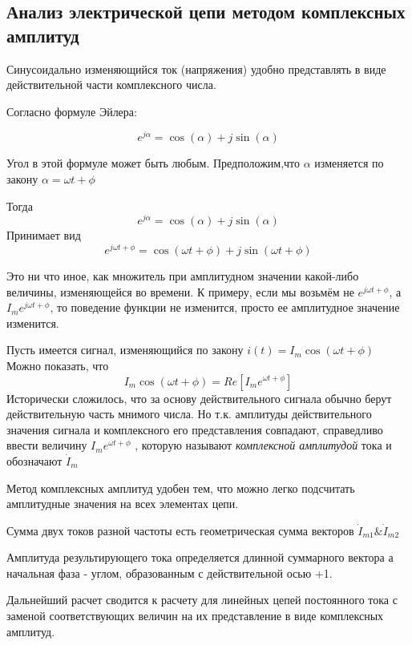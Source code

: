 \subsection{Анализ электрической цепи методом комплексных амплитуд}
\label{sec:complex}
Синусоидально изменяющийся ток (напряжения) удобно представлять в виде действительной части комплексного числа.

Согласно формуле Эйлера:

\begin{equation}
e^{j \alpha} = \cos(\alpha) + j \sin(\alpha)
\end{equation}

Угол в этой формуле может быть любым. Предположим,что $\alpha$ изменяется по закону $\alpha = \omega t + \phi$

Тогда 
$$ e^{j \alpha} = \cos(\alpha) + j \sin(\alpha)
$$
Принимает вид
$$
e^{j \omega t + \phi} = \cos(\omega t + \phi) + j \sin(\omega t + \phi)
$$

Это ни что иное, как множитель при амплитудном значении какой-либо величины, изменяющейся во времени. К примеру, если мы возьмём не $e^{j \omega t + \phi}$, а $I_{m}e^{j \omega t + \phi}$, то поведение функции не изменится, просто ее амплитудное значение изменится.

Пусть имеется сигнал, изменяющийся по закону $i(t) = I_{m}\cos(\omega t + \phi)$
Можно показать, что 
\begin{equation}
 I_m \cos (\omega t + \phi ) = Re[I_m e^{\omega t + \phi}]
\end{equation}
Исторически сложилось, что за основу действительного сигнала обычно берут действительную часть мнимого числа. 
Но т.к. амплитуды  действительного значения сигнала и комплексного его представления совпадают, справедливо ввести величину $I_m e^{\omega t + \phi}$ , которую называют \textit{комплексной амплитудой } тока и обозначают $\dot I_m$

Метод комплексных амплитуд удобен тем, что можно легко подсчитать амплитудные значения на всех элементах цепи.

Сумма двух токов разной частоты есть геометрическая сумма векторов $\dot I_{m1} \& \dot I_{m2}$

Амплитуда результирующего тока определяется длинной суммарного вектора а начальная фаза - углом, образованным с действительной осью +1.

Дальнейший расчет сводится к расчету для линейных цепей постоянного тока с заменой соответствующих величин на их представление в виде комплексных амплитуд.

